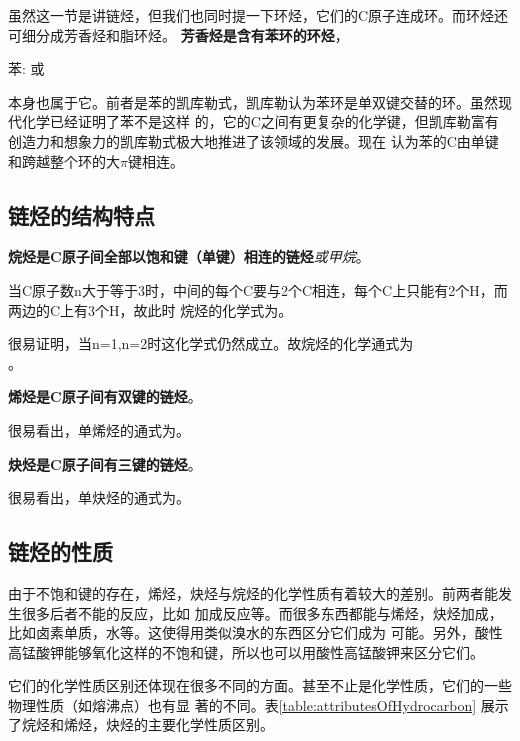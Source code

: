 虽然这一节是讲链烃，但我们也同时提一下环烃，它们的C原子连成环。而环烃还可细分成芳香烃和脂环烃。
\textbf{芳香烃是含有苯环的环烃}，
\begin{center}
苯:  或 
\end{center}
本身也属于它。前者是苯的凯库勒式，凯库勒认为苯环是单双键交替的环。虽然现代化学已经证明了苯不是这样
的，它的C之间有更复杂的化学键，但凯库勒富有创造力和想象力的凯库勒式极大地推进了该领域的发展。现在
认为苯的C由单键和跨越整个环的大$\pi$键相连。

\subsection{链烃的结构特点}
\textbf{烷烃是C原子间全部以饱和键（单键）相连的链烃}\emph{或甲烷}。

当C原子数n大于等于3时，中间的每个C要与2个C相连，每个C上只能有2个H，而两边的C上有3个H，故此时
烷烃的化学式为。

很易证明，当n=1,n=2时这化学式仍然成立。故烷烃的化学通式为\\
。

\textbf{烯烃是C原子间有双键的链烃}。

很易看出，单烯烃的通式为。

\textbf{炔烃是C原子间有三键的链烃}。

很易看出，单炔烃的通式为。

\subsection{链烃的性质}
由于不饱和键的存在，烯烃，炔烃与烷烃的化学性质有着较大的差别。前两者能发生很多后者不能的反应，比如
加成反应等。而很多东西都能与烯烃，炔烃加成，比如卤素单质，水等。这使得用类似溴水的东西区分它们成为
可能。另外，酸性高锰酸钾能够氧化这样的不饱和键，所以也可以用酸性高锰酸钾来区分它们。

它们的化学性质区别还体现在很多不同的方面。甚至不止是化学性质，它们的一些物理性质（如熔沸点）也有显
著的不同。表\ref{table:attributesOfHydrocarbon} 展示了烷烃和烯烃，炔烃的主要化学性质区别。

